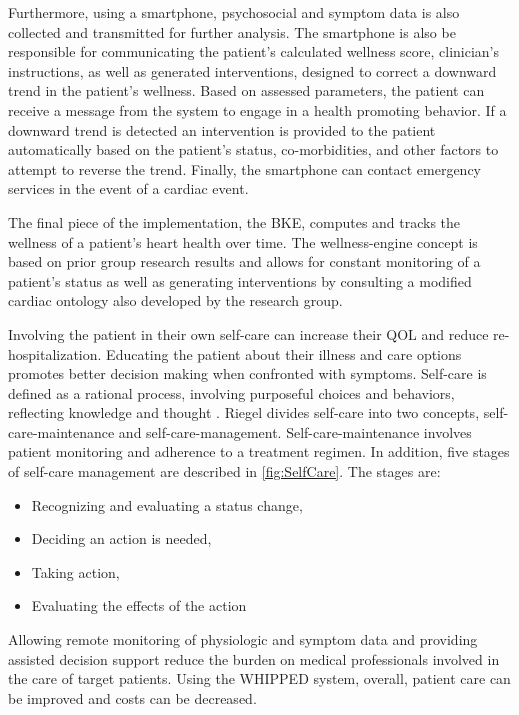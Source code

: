 Furthermore, using a smartphone, psychosocial and symptom data is also collected and transmitted for further analysis. The smartphone is also be responsible for communicating the patient's calculated wellness score, clinician's instructions, as well as generated interventions, designed to correct a downward trend in the patient's wellness.  Based on assessed parameters, the patient can receive a message from the system to engage in a health promoting behavior. If a downward trend is detected an intervention is provided to the patient automatically based on the patient's status, co-morbidities, and other factors to attempt to reverse the trend. Finally, the smartphone can contact emergency services in the event of a cardiac event.

The final piece of the implementation, the BKE, computes and tracks the wellness of a patient's heart health over time. The wellness-engine concept is based on prior group research results \cite{Chaiyasucheeva2012} and allows for constant monitoring of a patient's status as well as generating interventions by consulting a modified cardiac ontology also developed by the research group.

Involving the patient in their own self-care can increase their QOL and reduce re-hospitalization. Educating the patient about their illness and care options promotes better decision making when confronted with symptoms.  Self-care is defined as a rational process, involving purposeful choices and behaviors, reflecting knowledge and thought \cite{Riegel2008}. Riegel divides self-care into two concepts, self-care-maintenance and self-care-management.  Self-care-maintenance involves patient monitoring and adherence to a treatment regimen.  In addition, five stages of self-care management are described in \cref{fig:SelfCare}\cite{Riegel2008}. The stages are:
\begin{itemize}
\item  Recognizing and evaluating a status change, 
\item  Deciding an action is needed, 
\item  Taking action, 
\item  Evaluating the effects of the action
\end{itemize}
 Allowing remote monitoring of physiologic and symptom data and providing assisted decision support reduce the burden on medical professionals involved in the care of target patients. Using the WHIPPED system, overall, patient care can be improved and costs can be decreased. 

